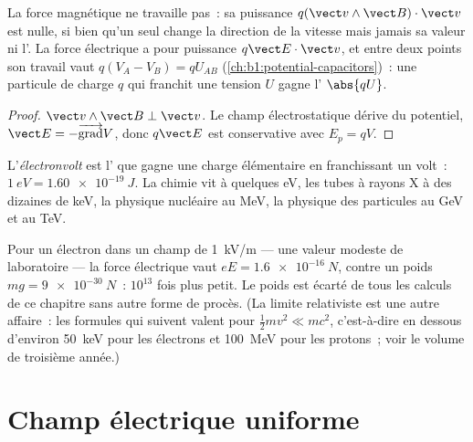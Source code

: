 \begin{proposition}\label{prop:b1:charged-particles:work}
La force magnétique ne travaille pas~: sa puissance $q(\vect v\wedge\vect B)\cdot\vect v$
est nulle, si bien qu'un  seul change la direction de la
vitesse mais jamais sa valeur ni l'. La force
électrique a pour puissance $q\vect E\cdot\vect v$, et entre deux points
son travail vaut $q(V_A - V_B) =
qU_{AB}$ (\cref{ch:b1:potential-capacitors})~: une particule de charge
$q$ qui franchit une tension $U$ gagne l' $\abs{qU}$.
\end{proposition}

\begin{proof}
$\vect v\wedge\vect B \perp \vect v$. Le champ électrostatique dérive du
potentiel, $\vect E = -\overrightarrow{\operatorname{grad}}V$, donc $q\vect E$
est conservative avec $E_p = qV$.
\end{proof}

\begin{definition}[L'électronvolt]\label{def:b1:charged-particles:eV}
L'\emph{électronvolt} est l' que gagne une charge
élémentaire en franchissant un volt~: $\qty{1}{eV} = \qty{1.60e-19}{J}$.
La chimie vit à quelques eV, les tubes à rayons X à des dizaines de keV,
la physique nucléaire au MeV, la physique des particules au GeV et au TeV.
\end{definition}

\begin{remark}\label{rem:b1:charged-particles:gravity}
Pour un électron dans un champ de \qty{1}{kV/m} --- une valeur modeste
de laboratoire --- la force électrique vaut $eE = \qty{1.6e-16}{N}$,
contre un poids $mg = \qty{9e-30}{N}$~: $10^{13}$ fois plus petit. Le
poids est écarté de tous les calculs de ce chapitre sans autre forme de
procès. (La limite relativiste est une autre affaire~: les formules qui
suivent valent pour $\tfrac12 mv^2 \ll mc^2$, c'est-à-dire en dessous
d'environ \qty{50}{keV} pour les électrons et \qty{100}{MeV} pour les
protons~; voir le volume de troisième année.)
\end{remark}

\section{Champ électrique uniforme}

